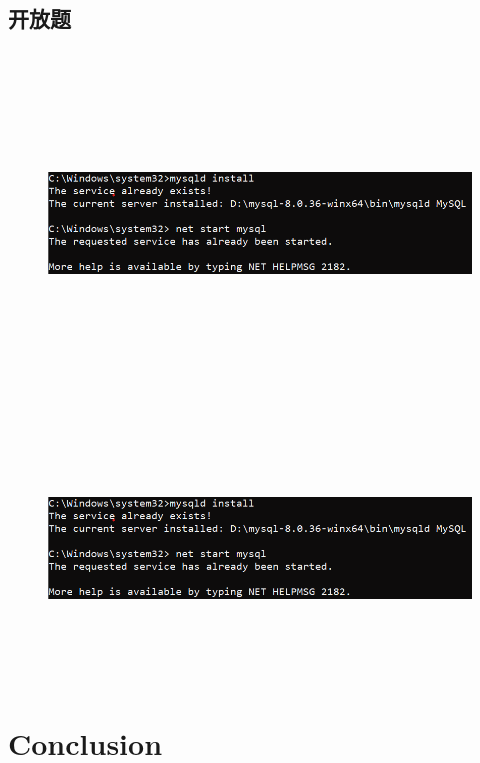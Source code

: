 \documentclass{ctexart}
\begin{document}
\subsection{开放题}
\subsubsection{}
\begin{lstlisting}[language=sql]
	
\end{lstlisting}
\begin{figure}[H]
	\centering 
	\includegraphics[height=7cm,width=14cm]{1.png}
	\end{figure}
\subsubsection{}
\begin{lstlisting}[language=sql]
	
\end{lstlisting}
\begin{figure}[H]
	\centering 
	\includegraphics[height=7cm,width=14cm]{1.png}
	\end{figure}
	\section{Conclusion}
    
\end{document}
